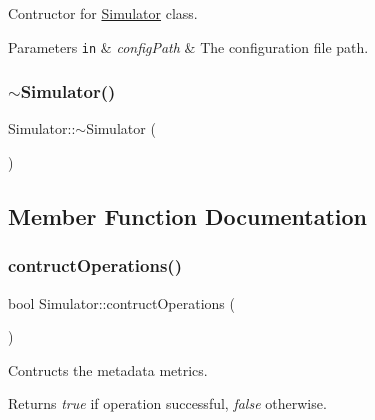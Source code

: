 Contructor for \hyperlink{class_simulator}{Simulator} class. 


\begin{DoxyParams}[1]{Parameters}
\mbox{\tt in}  & {\em config\+Path} & The configuration file path. \\
\hline
\end{DoxyParams}
\hypertarget{class_simulator_a0f49aa04f42060a785adf77346b9de9f}{}\label{class_simulator_a0f49aa04f42060a785adf77346b9de9f} 
\subsubsection{\texorpdfstring{$\sim$\+Simulator()}{~Simulator()}}
{\footnotesize\ttfamily Simulator\+::$\sim$\+Simulator (\begin{DoxyParamCaption}{ }\end{DoxyParamCaption})\hspace{0.3cm}{\ttfamily [inline]}}



\subsection{Member Function Documentation}
\hypertarget{class_simulator_ae032a5b2c6f4bb5ae3f129b070b37998}{}\label{class_simulator_ae032a5b2c6f4bb5ae3f129b070b37998} 
\subsubsection{\texorpdfstring{contruct\+Operations()}{contructOperations()}}
{\footnotesize\ttfamily bool Simulator\+::contruct\+Operations (\begin{DoxyParamCaption}{ }\end{DoxyParamCaption})\hspace{0.3cm}{\ttfamily [private]}}



Contructs the metadata metrics. 

\begin{DoxyReturn}{Returns}
{\itshape true} if operation successful, {\itshape false} otherwise. 
\end{DoxyReturn}
\hypertarget{class_simulator_ad89fec9f00924c116670418f2dd43b14}{}\label{class_simulator_ad89fec9f00924c116670418f2dd43b14} 
